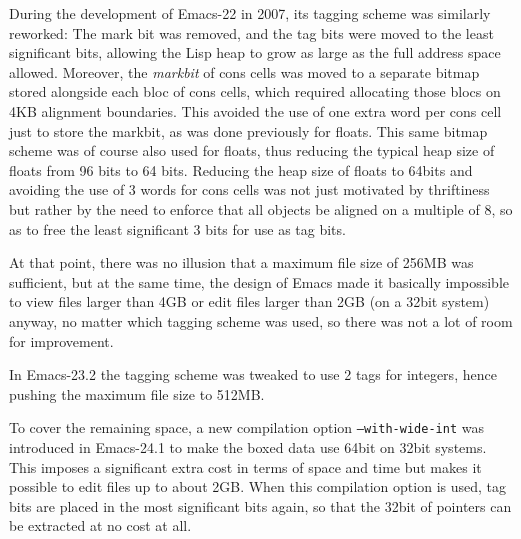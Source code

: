 \documentclass[format=acmsmall, review]{acmart}
\begin{document}
During the development of Emacs-22 in 2007, its tagging scheme was
similarly reworked: The mark bit was removed, and the tag bits were
moved to the least significant bits, allowing the Lisp heap to grow as
large as the full address space allowed.
Moreover, the \emph{markbit} of cons cells was moved to a separate bitmap
stored alongside each bloc of cons cells, which required allocating those
blocs on 4KB alignment boundaries.  This avoided the use of one extra word
per cons cell just to store the markbit, as was done previously for floats.
This same bitmap scheme
was of course also used for floats, thus reducing the typical heap size of
floats from 96 bits to 64 bits.  Reducing the heap size of floats to 64bits
and avoiding the use of 3 words for cons cells was not just motivated by
thriftiness but rather by the need to enforce that all objects be aligned on
a multiple of 8, so as to free the least significant 3 bits for use as
tag bits.

At that point, there was no illusion that a maximum file size of 256MB was
sufficient, but at the same time, the design of Emacs made it basically
impossible to view files larger than 4GB or edit files larger than 2GB (on
a 32bit system) anyway, no matter which tagging scheme was used, so there was
not a lot of room for improvement.

In Emacs-23.2 the tagging scheme was tweaked to use 2 tags for integers,
hence pushing the maximum file size to 512MB.

To cover the remaining space, a new compilation option
\texttt{--with-wide-int} was introduced in Emacs-24.1 to make the boxed data
use 64bit on 32bit systems.  This imposes a significant extra cost in terms
of space and time but makes it possible to edit files up to about 2GB.
When this compilation option is used, tag bits are placed in the most
significant bits again, so that the 32bit of pointers can be extracted at no
cost at all.

\end{document}
